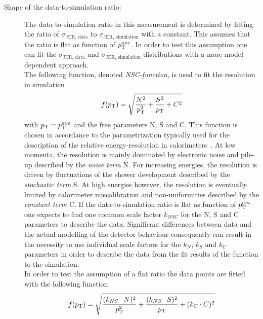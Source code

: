\begin{description}
\item[Shape of the data-to-simulation ratio:] The data-to-simulation ratio in this measurement is determined by fitting the ratio of $\sigma_\mathrm{JER,\, data}$ to $\sigma_\mathrm{JER,\, simulation}$ with a constant. This assumes that the ratio is flat as function of $p_{\text{T}}^{ave}$. In order to test this assumption one can fit the $\sigma_\mathrm{JER,\, data}$ and $\sigma_\mathrm{JER,\, simulation}$ distributions with a more model dependent approach. \\ 
The following function, denoted \textit{NSC-function}, is used to fit the resolution in simulation
\begin{equation}
f(p_{\text{T}}) = \sqrt{\frac{N^2}{p_{\text{T}}^{2}} + \frac{S^2}{p_{\text{T}}} + C^2}
\end{equation}
with $p_{\text{T}}=p_{\text{T}}^{ave}$ and the free parameters N, S and C. This function is chosen in accordance to the parametrization typically used for the description of the relative energy-resolution in calorimeters~\cite{bib:PDG:2012}. At low momenta, the resolution is mainly dominated by electronic noise and pile-up described by the \textit{noise term} N. For increasing energies, the resolution is driven by fluctuations of the shower development described by the \textit{stochastic term} S. At high energies however, the resolution is eventually limited by calorimeter miscalibration and non-uniformities described by the \textit{constant term} C. If the data-to-simulation ratio is flat as function of $p_{\text{T}}^{ave}$ one expects to find one common scale factor $k_{NSC}$ for the N, S and C parameters to describe the data. Significant differences between data and the actual modelling of the detector behaviour consequently can result in the necessity to use individual scale factors for the $k_N$, $k_S$ and $k_C$ parameters in order to describe the data from the fit results of the function to the simulation. \\
In order to test the assumption of a flat ratio the data points are fitted with the following function 
\begin{equation}
f(p_{\text{T}}) = \sqrt{\frac{(k_{NS} \cdot N)^2}{p_{\text{T}}^{2}} + \frac{(k_{NS} \cdot S)^2}{p_{\text{T}}} + (k_{C} \cdot C)^2} 
\end{equation} 

\end{description}
